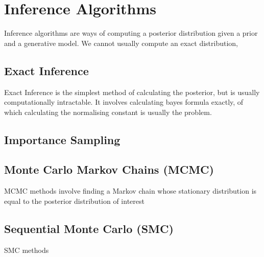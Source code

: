 \section{Inference Algorithms}

Inference algorithms are ways of computing a posterior distribution given a prior and a generative model. We cannot usually compute an exact distribution, 

\subsection{Exact Inference}

Exact Inference is the simplest method of calculating the posterior, but is usually computationally intractable. It involves calculating bayes formula exactly, of which calculating the normalising constant is usually the problem.

\subsection{Importance Sampling}
\subsection{Monte Carlo Markov Chains (MCMC)}

MCMC methods involve finding a Markov chain whose stationary distribution is equal to the posterior distribution of interest

\subsection{Sequential Monte Carlo (SMC)}

SMC methods 

